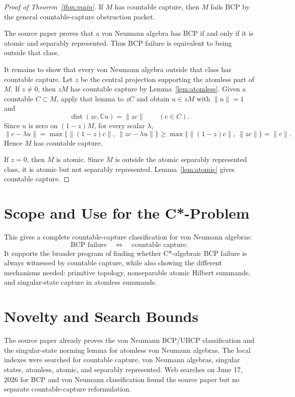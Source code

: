 \documentclass[11pt]{article}
\newcommand{\C}{\mathbb C}
\newcommand{\dist}{\operatorname{dist}}
\begin{document}
\begin{proof}[Proof of Theorem~\ref{thm:main}]
If \(M\) has countable capture, then \(M\) fails BCP by the general
countable-capture obstruction packet.

The source paper proves that a von Neumann algebra has BCP if and only if it
is atomic and separably represented.  Thus BCP failure is equivalent to being
outside that class.

It remains to show that every von Neumann algebra outside that class has
countable capture.  Let \(z\) be the central projection supporting the
atomless part of \(M\).  If \(z\ne0\), then \(zM\) has countable capture by
Lemma~\ref{lem:atomless}.  Given a countable \(C\subset M\), apply that
lemma to \(zC\) and obtain \(u\in zM\) with \(\|u\|=1\) and
\[
        \dist(zc,\C u)=\|zc\|\qquad(c\in C).
\]
Since \(u\) is zero on \((1-z)M\), for every scalar \(\lambda\),
\[
        \|c-\lambda u\|
        =
        \max\{\|(1-z)c\|,\ \|zc-\lambda u\|\}
        \ge
        \max\{\|(1-z)c\|,\ \|zc\|\}
        =
        \|c\|.
\]
Hence \(M\) has countable capture.

If \(z=0\), then \(M\) is atomic.  Since \(M\) is outside the atomic
separably represented class, it is atomic but not separably represented.
Lemma~\ref{lem:atomic} gives countable capture.
\end{proof}

\section*{Scope and Use for the C*-Problem}

This gives a complete countable-capture classification for von Neumann
algebras:
\[
        \text{BCP failure}
        \quad\Longleftrightarrow\quad
        \text{countable capture}.
\]
It supports the broader program of finding whether C*-algebraic BCP failure
is always witnessed by countable capture, while also showing the different
mechanisms needed: primitive topology, nonseparable atomic Hilbert summands,
and singular-state capture in atomless summands.

\section*{Novelty and Search Bounds}

The source paper already proves the von Neumann BCP/UBCP classification and
the singular-state norming lemma for atomless von Neumann algebras.  The local
indexes were searched for countable capture, von Neumann algebras, singular
states, atomless, atomic, and separably represented.  Web searches on June 17,
2026 for BCP and von Neumann classification found the source paper but no
separate countable-capture reformulation.
\end{document}
